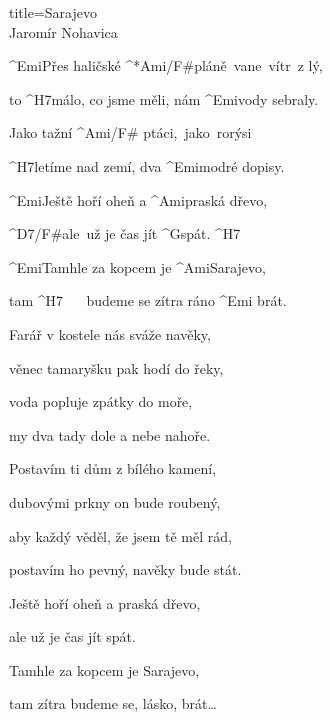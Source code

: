 \begin{song}{title=\predtitle\centering Sarajevo \\\large Jaromír Nohavica \vspace*{-0.3cm}}  %
\begin{centerjustified}
\nejvetsi

\sloka 
	^{Emi}Přes haličské ^*{Ami/F#}pláně~vane~vítr~z lý,
	
	to ^{H7\z}málo, co jsme měli, nám ^{Emi\z}vody sebraly.
	
	Jako tažní ^{Ami/F# }ptáci,~jako~rorýsi
	
	^{H7\z}letíme nad zemí, dva ^{Emi\z}modré dopisy.

	^{Emi\z}Ještě hoří oheň a ^{Ami\z}praská dřevo,
	
	^{D7/F#\z}ale~už je čas jít ^{G\z}spát. ^{H7}

	^{Emi\z}Tamhle za kopcem je ^{Ami\z}Sarajevo,
	
	tam ^{H7\,\,\,\,\,\,\,\,\,\,}budeme se zítra ráno ^{Emi\,\,}brát.

\sloka
	Farář v kostele nás sváže navěky,
	
	věnec tamaryšku pak hodí do řeky,
	
	voda popluje zpátky do moře,
	
	my dva tady dole a nebe nahoře.


\sloka
	Postavím ti dům z bílého kamení,
	
	dubovými prkny on bude roubený,

	aby každý věděl, že jsem tě měl rád,
	
	postavím ho pevný, navěky bude stát.

	Ještě hoří oheň a praská dřevo,
	
	ale už je čas jít spát.
	
	Tamhle za kopcem je Sarajevo,
	
	tam zítra budeme se, lásko, brát\elipsa\dots

\end{centerjustified}
\setcounter{Slokočet}{0}
\end{song}
